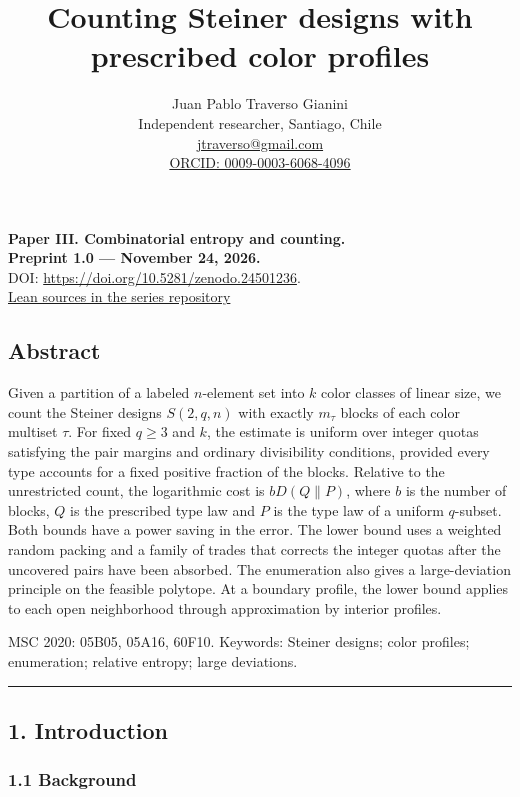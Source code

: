 \documentclass[english,11pt,a4paper]{article}
\title{Counting Steiner designs with prescribed color profiles}
\author{Juan Pablo Traverso Gianini\\\small Independent researcher, Santiago, Chile\\\small \href{mailto:jtraverso@gmail.com}{jtraverso@gmail.com}\\\small \href{https://orcid.org/0009-0003-6068-4096}{ORCID: 0009-0003-6068-4096}}\date{}
\begin{document}
\raggedbottom\maketitle
\begin{center}
\textbf{Paper III. Combinatorial entropy and counting.}\\
\textbf{Preprint 1.0 --- November 24, 2026.}\\
DOI: \url{https://doi.org/10.5281/zenodo.24501236}.\\
\href{https://github.com/jtraverso/latinon-entropy-ldp/tree/main/preprints/STEINER-PROFILES/05_formalization/lean}{Lean sources in the series repository}\end{center}
\subsection{Abstract}\label{abstract}

Given a partition of a labeled \(n\)-element set into \(k\) color classes of linear size, we count the Steiner designs \(S(2,q,n)\) with exactly \(m_\tau\) blocks of each color multiset \(\tau\). For fixed \(q\ge3\) and \(k\), the estimate is uniform over integer quotas satisfying the pair margins and ordinary divisibility conditions, provided every type accounts for a fixed positive fraction of the blocks. Relative to the unrestricted count, the logarithmic cost is \(bD(Q\|P)\), where \(b\) is the number of blocks, \(Q\) is the prescribed type law and \(P\) is the type law of a uniform \(q\)-subset. Both bounds have a power saving in the error. The lower bound uses a weighted random packing and a family of trades that corrects the integer quotas after the uncovered pairs have been absorbed. The enumeration also gives a large-deviation principle on the feasible polytope. At a boundary profile, the lower bound applies to each open neighborhood through approximation by interior profiles.

MSC 2020: 05B05, 05A16, 60F10. Keywords: Steiner designs; color profiles; enumeration; relative entropy; large deviations.

\begin{center}\rule{0.5\linewidth}{0.5pt}\end{center}

\subsection{1. Introduction}\label{introduction}

\subsubsection{1.1 Background}\label{background}
\end{document}
